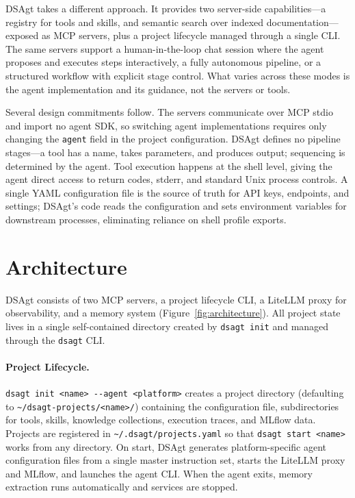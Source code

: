 \documentclass[11pt]{article}
\begin{document}
DSAgt takes a different approach.
It provides two server-side capabilities---a registry for
tools and skills, and semantic search over indexed
documentation---exposed as MCP servers, plus a project
lifecycle managed through a single CLI.
The same servers support a human-in-the-loop chat session
where the agent proposes and executes steps interactively,
a fully autonomous pipeline, or a structured workflow with
explicit stage control.
What varies across these modes is the agent implementation
and its guidance, not the servers or tools.

Several design commitments follow.
The servers communicate over MCP stdio and import no agent
SDK, so switching agent implementations requires only changing
the \texttt{agent} field in the project configuration.
DSAgt defines no pipeline stages---a tool has a name, takes
parameters, and produces output; sequencing is determined by
the agent.
Tool execution happens at the shell level, giving the agent
direct access to return codes, stderr, and standard Unix
process controls.
A single YAML configuration file is the source of truth for
API keys, endpoints, and settings; DSAgt's code reads the
configuration and sets environment variables for downstream
processes, eliminating reliance on shell profile exports.


\section{Architecture}

DSAgt consists of two MCP servers, a project lifecycle CLI,
a LiteLLM proxy for observability, and a memory system
(Figure~\ref{fig:architecture}).
All project state lives in a single self-contained directory
created by \texttt{dsagt init} and managed through the
\texttt{dsagt} CLI.

\paragraph{Project Lifecycle.}
\texttt{dsagt init <name> -{}-agent <platform>} creates a
project directory (defaulting to
\texttt{\textasciitilde/dsagt-projects/<name>/}) containing
the configuration file, subdirectories for tools, skills,
knowledge collections, execution traces, and MLflow data.
Projects are registered in
\texttt{\textasciitilde/.dsagt/projects.yaml} so that
\texttt{dsagt start <name>} works from any directory.
On start, DSAgt generates platform-specific agent
configuration files from a single master instruction set,
starts the LiteLLM proxy and MLflow, and launches the agent
CLI.
When the agent exits, memory extraction runs automatically
and services are stopped.
\end{document}
